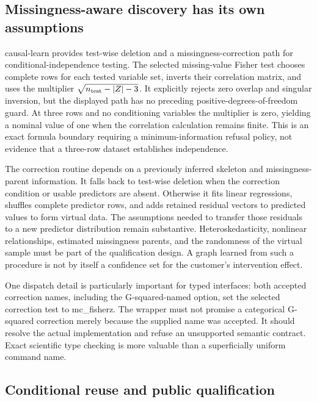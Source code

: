 \subsection{Missingness-aware discovery has its own assumptions}

causal-learn provides test-wise deletion and a missingness-correction path for conditional-independence testing. The selected missing-value Fisher test chooses complete rows for each tested variable set, inverts their correlation matrix, and uses the multiplier $\sqrt{n_{\rm test}-|Z|-3}$. It explicitly rejects zero overlap and singular inversion, but the displayed path has no preceding positive-degrees-of-freedom guard. At three rows and no conditioning variables the multiplier is zero, yielding a nominal value of one when the correlation calculation remains finite. This is an exact formula boundary requiring a minimum-information refusal policy, not evidence that a three-row dataset establishes independence.~\citep{exec25_ptm_causallearn,exec25_ptm_choice}

The correction routine depends on a previously inferred skeleton and missingness-parent information. It falls back to test-wise deletion when the correction condition or usable predictors are absent. Otherwise it fits linear regressions, shuffles complete predictor rows, and adds retained residual vectors to predicted values to form virtual data. The assumptions needed to transfer those residuals to a new predictor distribution remain substantive. Heteroskedasticity, nonlinear relationships, estimated missingness parents, and the randomness of the virtual sample must be part of the qualification design. A graph learned from such a procedure is not by itself a confidence set for the customer's intervention effect.~\citep{exec25_ptm_causallearn}

One dispatch detail is particularly important for typed interfaces: both accepted correction names, including the G-squared-named option, set the selected correction test to mc\_fisherz. The wrapper must not promise a categorical G-squared correction merely because the supplied name was accepted. It should resolve the actual implementation and refuse an unsupported semantic contract. Exact scientific type checking is more valuable than a superficially uniform command name.~\citep{exec25_ptm_causallearn}

\subsection{Conditional reuse and public qualification}

